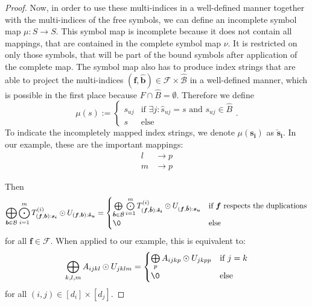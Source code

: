 \begin{proof}
    Now, in order to use these multi-indices in a well-defined manner together with the multi-indices of the free symbols, we can define an incomplete symbol map $\mu: S \rightarrow S$.
    This symbol map is incomplete because it does not contain all mappings, that are contained in the complete symbol map $\nu$.
    It is restricted on only those symbols, that will be part of the bound symbols after application of the complete map.
    The symbol map also has to produce index strings that are able to project the multi-indices $(\bm{f},\bm{\hat{b}}) \in \mathcal{F} \times \mathcal{\hat{B}}$ in a well-defined manner, which is possible in the first place because $F \cap \hat{B} = \emptyset$.
    Therefore we define
    $$\mu(s) := \begin{cases}
            s_{uj} & \text{if } \exists j: \hat{s}_{uj} = s \text{ and } s_{uj} \in \hat{B} \\
            s      & \text{else}
        \end{cases}.$$
    To indicate the incompletely mapped index strings, we denote $\mu(\bm{s_i})$ as $\bm{\check{s}_i}$.
    In our example, these are the important mappings:
    \begin{align*}
        l & \rightarrow p \\
        m & \rightarrow p
    \end{align*}

    Then
    $$\bigoplus\limits_{\bm{b} \in \mathcal{B}} \bigodot\limits_{i = 1}^{m} T^{(i)}_{(\bm{f}, \bm{b}):\bm{s_i}} \odot U_{(\bm{f}, \bm{b}):\bm{\hat{s}_u}}
        = \begin{cases}
            \bigoplus\limits_{\bm{\hat{b}} \in \mathcal{\hat{B}}} \bigodot\limits_{i = 1}^{m} T^{(i)}_{(\bm{f}, \bm{\hat{b}}):\bm{\check{s}_i}} \odot U_{(\bm{f}, \bm{\hat{b}}):\bm{s_u}} & \text{if } \bm{f} \text{ respects the duplications} \\
            \0                                                                                                                                                                            & \text{else}
        \end{cases}$$
    for all $\bm{f} \in \mathcal{F}$.
    When applied to our example, this is equivalent to:
    $$\bigoplus\limits_{k, l, m} A_{ijkl} \odot U_{jklm}
        = \begin{cases}
            \bigoplus\limits_{p} A_{ijkp} \odot U_{jkpp} & \text{if } j = k \\
            \0                                           & \text{else}
        \end{cases}$$
    for all $(i,j) \in [d_i] \times [d_j]$.


\end{proof}
